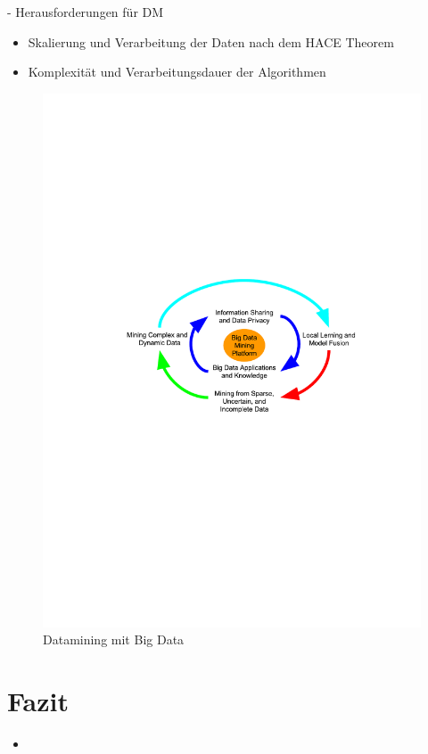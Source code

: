 \documentclass[fleqn,11pt,aspectratio=43]{beamer}
\begin{document}
\begin{frame}{\insertsectionhead - Herausforderungen für DM \cite{wu2014data}}
\begin{itemize} 
\item Skalierung und Verarbeitung der Daten nach dem HACE Theorem
\item Komplexität und Verarbeitungsdauer der Algorithmen
\end{itemize}
\vspace{-1em}
\begin{figure} %
\includegraphics[scale=0.65,trim={120 340 100 280},clip]{img/bigdata42.pdf}
\caption{Datamining mit Big Data \cite{wu2014data}}
\label{bigdata}
\end{figure}
\end{frame}

\section{Fazit~}
\begin{frame}{\insertsectionhead}
\begin{itemize}
\item 
\end{itemize}
\end{frame}
\end{document}
